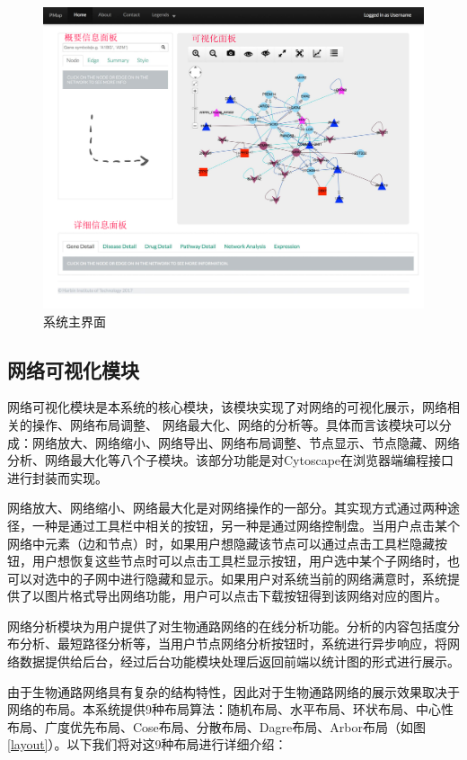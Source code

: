 \begin{figure}[h]
\centering
\includegraphics[width = 1.0\textwidth]{UI}
\caption[UI]{系统主界面}
\label{UI}
\end{figure}

\subsection{网络可视化模块}
网络可视化模块是本系统的核心模块，该模块实现了对网络的可视化展示，网络相关的操作、网络布局调整、 网络最大化、网络的分析等。具体而言该模块可以分成：网络放大、网络缩小、网络导出、网络布局调整、节点显示、节点隐藏、网络分析、网络最大化等八个子模块。该部分功能是对Cytoscape在浏览器端编程接口进行封装而实现。 

网络放大、网络缩小、网络最大化是对网络操作的一部分。其实现方式通过两种途径，一种是通过工具栏中相关的按钮，另一种是通过网络控制盘。当用户点击某个网络中元素（边和节点）时，如果用户想隐藏该节点可以通过点击工具栏隐藏按钮，用户想恢复这些节点时可以点击工具栏显示按钮，用户选中某个子网络时，也可以对选中的子网中进行隐藏和显示。如果用户对系统当前的网络满意时，系统提供了以图片格式导出网络功能，用户可以点击下载按钮得到该网络对应的图片。

网络分析模块为用户提供了对生物通路网络的在线分析功能。分析的内容包括度分布分析、最短路径分析等，当用户节点网络分析按钮时，系统进行异步响应，将网络数据提供给后台，经过后台功能模块处理后返回前端以统计图的形式进行展示。

由于生物通路网络具有复杂的结构特性，因此对于生物通路网络的展示效果取决于网络的布局。本系统提供9种布局算法：随机布局、水平布局、环状布局、中心性布局、广度优先布局、Cose布局、分散布局、Dagre布局、Arbor布局（如图\ref{layout}）。以下我们将对这9种布局进行详细介绍：

